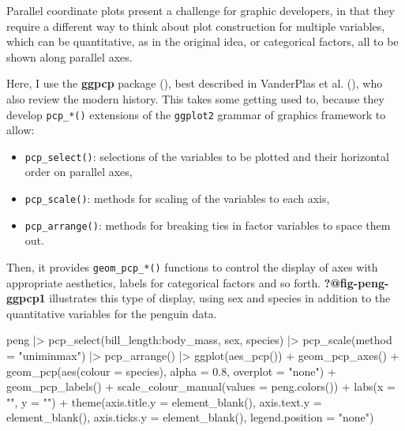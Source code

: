 \documentclass[
  letterpaper,
  10pt,
  krantz2]{krantz}
\makeatletter
\newenvironment{Shaded}{\begin{snugshade}}{\end{snugshade}}
\newcommand{\AttributeTok}[1]{\textcolor[rgb]{0.40,0.45,0.13}{#1}}
\newcommand{\FloatTok}[1]{\textcolor[rgb]{0.68,0.00,0.00}{#1}}
\newcommand{\FunctionTok}[1]{\textcolor[rgb]{0.28,0.35,0.67}{#1}}
\newcommand{\NormalTok}[1]{\textcolor[rgb]{0.00,0.23,0.31}{#1}}
\newcommand{\SpecialCharTok}[1]{\textcolor[rgb]{0.37,0.37,0.37}{#1}}
\newcommand{\StringTok}[1]{\textcolor[rgb]{0.13,0.47,0.30}{#1}}
\providecommand{\tightlist}{%
  \setlength{\itemsep}{0pt}\setlength{\parskip}{0pt}}\usepackage{longtable,booktabs,array}
\newenvironment{kframe}{%
  \medskip{}
  \setlength{\fboxsep}{.8em}
  \def\at@end@of@kframe{}%
  \ifinner\ifhmode%
  \def\at@end@of@kframe{\end{minipage}}%
  \begin{minipage}{\columnwidth}%
  \fi\fi%
  \def\FrameCommand##1{\hskip\@totalleftmargin \hskip-\fboxsep
  \colorbox{shadecolor}{##1}\hskip-\fboxsep
      \hskip-\linewidth \hskip-\@totalleftmargin \hskip\columnwidth}%
  \MakeFramed {\advance\hsize-\width
    \@totalleftmargin\z@ \linewidth\hsize
    \@setminipage}}%
{\par\unskip\endMakeFramed%
  \at@end@of@kframe}
\renewenvironment{Shaded}{\begin{kframe}}{\end{kframe}}
\makeatother
\begin{document}
Parallel coordinate plots present a challenge for graphic developers, in
that they require a different way to think about plot construction for
multiple variables, which can be quantitative, as in the original idea,
or categorical factors, all to be shown along parallel axes.

Here, I use the \textbf{ggpcp} package (), best described in VanderPlas et al.
(), who also review the modern
history. This takes some getting used to, because they develop
\texttt{pcp\_*()} extensions of the \texttt{ggplot2} grammar of graphics
framework to allow:

\begin{itemize}
\tightlist
\item
  \texttt{pcp\_select()}: selections of the variables to be plotted and
  their horizontal order on parallel axes,
\item
  \texttt{pcp\_scale()}: methods for scaling of the variables to each
  axis,
\item
  \texttt{pcp\_arrange()}: methods for breaking ties in factor variables
  to space them out.
\end{itemize}

Then, it provides \texttt{geom\_pcp\_*()} functions to control the
display of axes with appropriate aesthetics, labels for categorical
factors and so forth. \textbf{?@fig-peng-ggpcp1} illustrates this type
of display, using sex and species in addition to the quantitative
variables for the penguin data.

\begin{Shaded}
\begin{Highlighting}[]
\NormalTok{peng }\SpecialCharTok{|\textgreater{}}
  \FunctionTok{pcp\_select}\NormalTok{(bill\_length}\SpecialCharTok{:}\NormalTok{body\_mass, sex, species) }\SpecialCharTok{|\textgreater{}}
  \FunctionTok{pcp\_scale}\NormalTok{(}\AttributeTok{method =} \StringTok{"uniminmax"}\NormalTok{) }\SpecialCharTok{|\textgreater{}}
  \FunctionTok{pcp\_arrange}\NormalTok{() }\SpecialCharTok{|\textgreater{}}
  \FunctionTok{ggplot}\NormalTok{(}\FunctionTok{aes\_pcp}\NormalTok{()) }\SpecialCharTok{+}
  \FunctionTok{geom\_pcp\_axes}\NormalTok{() }\SpecialCharTok{+}
  \FunctionTok{geom\_pcp}\NormalTok{(}\FunctionTok{aes}\NormalTok{(}\AttributeTok{colour =}\NormalTok{ species), }\AttributeTok{alpha =} \FloatTok{0.8}\NormalTok{, }\AttributeTok{overplot =} \StringTok{"none"}\NormalTok{) }\SpecialCharTok{+}
  \FunctionTok{geom\_pcp\_labels}\NormalTok{() }\SpecialCharTok{+}
  \FunctionTok{scale\_colour\_manual}\NormalTok{(}\AttributeTok{values =} \FunctionTok{peng.colors}\NormalTok{()) }\SpecialCharTok{+}
  \FunctionTok{labs}\NormalTok{(}\AttributeTok{x =} \StringTok{""}\NormalTok{, }\AttributeTok{y =} \StringTok{""}\NormalTok{) }\SpecialCharTok{+}
  \FunctionTok{theme}\NormalTok{(}\AttributeTok{axis.title.y =} \FunctionTok{element\_blank}\NormalTok{(), }\AttributeTok{axis.text.y =} \FunctionTok{element\_blank}\NormalTok{(), }
        \AttributeTok{axis.ticks.y =} \FunctionTok{element\_blank}\NormalTok{(), }\AttributeTok{legend.position =} \StringTok{"none"}\NormalTok{)}
\end{Highlighting}
\end{Shaded}
\end{document}
